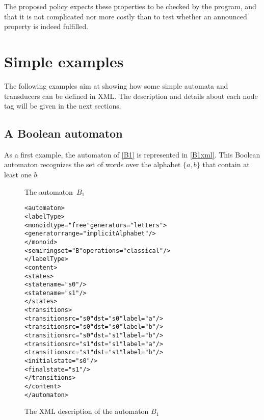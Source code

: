 \documentclass[a4paper]{article}
\newcommand{\medskipneg}{\vspace*{-2ex}} %
\begin{document}
The proposed policy expects these properties to be checked by the
program, and that it is not complicated nor more costly than to test
whether an announced property is indeed fulfilled.

\section{Simple examples}

The following examples aim at showing how some simple automata and transducers
can be defined in XML. The description and details about each node tag will be
given in the next sections.

\subsection{A Boolean automaton}

As a first example, the automaton of \autoref{B1} is represented in
\autoref{B1xml}. This Boolean automaton recognizes the set of words
over the alphabet $\{a,b\}$ that contain at least one $b$.

\begin{figure}[ht]
\begin{center}
\end{center}
\vspace*{-.8cm}
\caption{The automaton~$B_1$}\label{B1}
\medskipneg
\end{figure}

\begin{figure}[ht]
  \small
  \begin{center}
\begin{alltt}
<automaton>
  <labelType>
    <monoid type="free" generators="letters">
       <generator range="implicitAlphabet"/>
    </monoid>
    <semiring set="B" operations="classical"/>
  </labelType>
  <content>
    <states>
       <state name="s0"/>
       <state name="s1"/>
    </states>
    <transitions>
       <transition src="s0" dst="s0" label="a"/>
       <transition src="s0" dst="s0" label="b"/>
       <transition src="s0" dst="s1" label="b"/>
       <transition src="s1" dst="s1" label="a"/>
       <transition src="s1" dst="s1" label="b"/>
       <initial state="s0"/>
       <final state="s1"/>
    </transitions>
  </content>
</automaton>
\end{alltt}

\caption{The XML description of the automaton $B_1$}
\label{B1xml}
  \end{center}
\end{figure}
\end{document}
